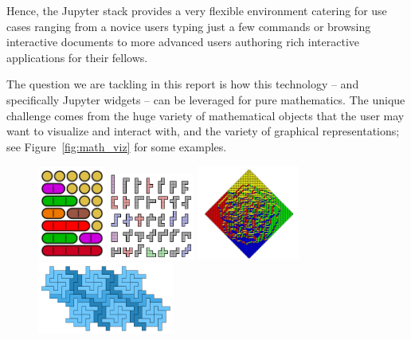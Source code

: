 \documentclass{deliverablereport}
\begin{document}

Hence, the Jupyter stack provides a very flexible environment catering
for use cases ranging from a novice users typing just a few commands
or browsing interactive documents to more advanced users authoring
rich interactive applications for their fellows.

The question we are tackling in this report is how this technology --
and specifically Jupyter widgets -- can be leveraged for pure
mathematics. The unique challenge comes from the huge variety of
mathematical objects that the user may want to visualize and
interact with, and the variety of graphical representations;
see Figure~\ref{fig:math_viz} for some examples.


\begin{figure}%
  \begin{center}
    \includegraphics[width=0.20\textwidth]{images/partitions-of-5}
    \hfil\hfil
    \includegraphics[width=0.25\textwidth]{images/hexominoes}
    \hfil
    \includegraphics[width=0.30\textwidth]{images/AztecDiamond}
    \includegraphics[width=0.4\textwidth]{images/nonominoes}

\end{center}
\end{figure}
\end{document}
